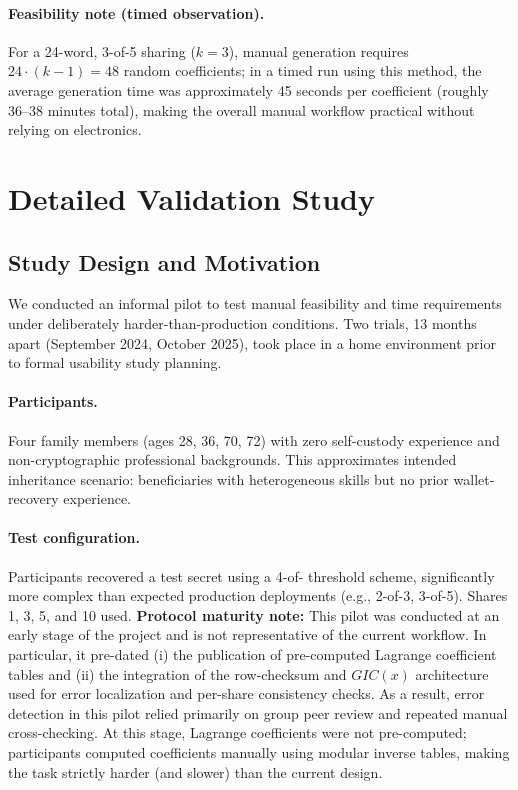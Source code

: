 \documentclass[11pt]{article}
\begin{document}
\paragraph{Feasibility note (timed observation).} For a 24-word, 3-of-5 sharing ($k=3$), manual generation requires $24\cdot(k-1)=48$ random coefficients; in a timed run using this method, the average generation time was approximately 45 seconds per coefficient (roughly 36--38 minutes total), making the overall manual workflow practical without relying on electronics.

\section{Detailed Validation Study}
\label{app:validation}

\subsection{Study Design and Motivation}

We conducted an informal pilot to test manual feasibility and time requirements under deliberately harder-than-production conditions. Two trials, 13 months apart (September 2024, October 2025), took place in a home environment prior to formal usability study planning.

\paragraph{Participants.} Four family members (ages 28, 36, 70, 72) with zero self-custody experience and non-cryptographic professional backgrounds. This approximates intended inheritance scenario: beneficiaries with heterogeneous skills but no prior wallet-recovery experience.

\paragraph{Test configuration.} Participants recovered a test secret using a 4-of- threshold scheme, significantly more complex than expected production deployments (e.g., 2-of-3, 3-of-5). Shares 1, 3, 5, and 10 used.
\textbf{Protocol maturity note:} This pilot was conducted at an early stage of the project and is not representative of the current workflow. In particular, it pre-dated (i) the publication of pre-computed Lagrange coefficient tables and (ii) the integration of the row-checksum and $GIC(x)$ architecture used for error localization and per-share consistency checks. As a result, error detection in this pilot relied primarily on group peer review and repeated manual cross-checking.
At this stage, Lagrange coefficients were not pre-computed; participants computed coefficients manually using modular inverse tables, making the task strictly harder (and slower) than the current design.
\end{document}

